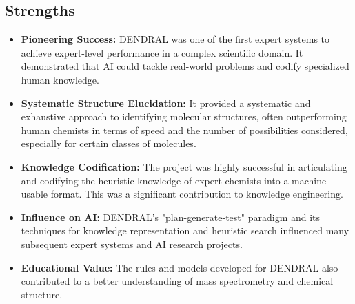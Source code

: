 \documentclass[12pt,a4paper]{article}
\begin{document}
\subsection{Strengths}
\begin{itemize}
    \item \textbf{Pioneering Success:} DENDRAL was one of the first expert systems to achieve expert-level performance in a complex scientific domain. It demonstrated that AI could tackle real-world problems and codify specialized human knowledge.
    \item \textbf{Systematic Structure Elucidation:} It provided a systematic and exhaustive approach to identifying molecular structures, often outperforming human chemists in terms of speed and the number of possibilities considered, especially for certain classes of molecules.
    \item \textbf{Knowledge Codification:} The project was highly successful in articulating and codifying the heuristic knowledge of expert chemists into a machine-usable format. This was a significant contribution to knowledge engineering.
    \item \textbf{Influence on AI:} DENDRAL's "plan-generate-test" paradigm and its techniques for knowledge representation and heuristic search influenced many subsequent expert systems and AI research projects.
    \item \textbf{Educational Value:} The rules and models developed for DENDRAL also contributed to a better understanding of mass spectrometry and chemical structure.
\end{itemize}
\end{document}
